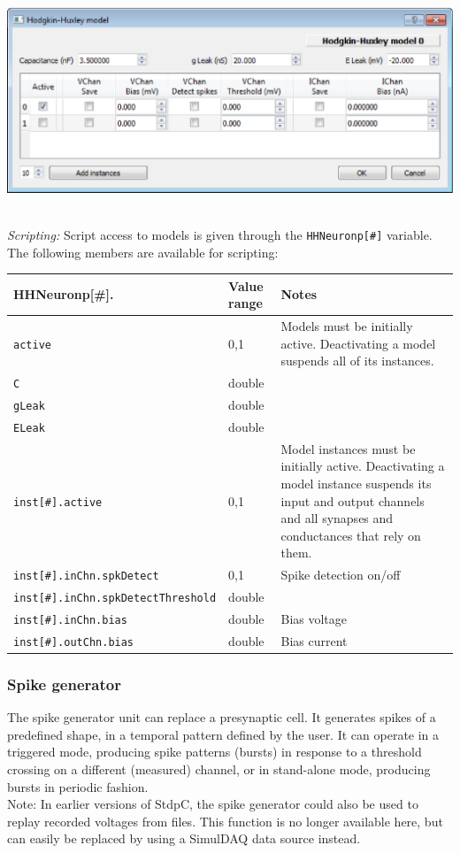 \documentclass{article}
\begin{document}
\noindent
\parbox{\textwidth}{
	\includegraphics[scale=0.5]{HHmodel}
} \\[0.2cm]

\noindent
\emph{Scripting:} Script access to models is given through the \texttt{HHNeuronp[\#]} variable.
The following members are available for scripting: \\
\begin{tabularx}{\linewidth}{|ll|X|}
	\hline
	{\bf HHNeuronp[\#].\textvisiblespace} & {\bf Value range} & {\bf Notes} \\
	\hline
	\texttt{active} & 0,1 & Models must be initially active. Deactivating a model suspends all of
	its instances. \\
	\texttt{C} & double & \\
	\texttt{gLeak} & double & \\
	\texttt{ELeak} & double & \\
	\texttt{inst[\#].active} & 0,1 & Model instances must be initially active. Deactivating a model instance
	suspends its input and output channels and all synapses and conductances that rely on them. \\
	\texttt{inst[\#].inChn.spkDetect} & 0,1 & Spike detection on/off \\
	\texttt{inst[\#].inChn.spkDetectThreshold} & double & \\
	\texttt{inst[\#].inChn.bias} & double & Bias voltage \\
	\texttt{inst[\#].outChn.bias} & double & Bias current \\
	\hline
\end{tabularx}

\subsubsection{Spike generator} \label{spikegen}
The spike generator unit can replace a presynaptic cell. It generates spikes of a 
predefined shape, in a temporal pattern defined by the user. It can operate in
a triggered mode, producing spike patterns (bursts) in response to a threshold crossing
on a different (measured) channel, or in stand-alone mode, producing bursts in
periodic fashion. \\
Note: In earlier versions of StdpC, the spike generator could also be used to
replay recorded voltages from files. This function is no longer available
here, but can easily be replaced by using a SimulDAQ data source instead.\\
\end{document}
